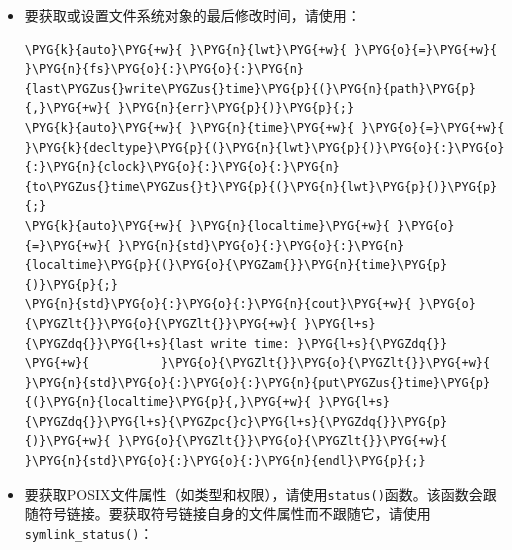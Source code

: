 \begin{itemize}

\item 要获取或设置文件系统对象的最后修改时间，请使用：



\begin{codeblockbg}
\begin{Verbatim}[commandchars=\\\{\},breaklines=true,breakanywhere=true,fontsize=\codefont,xleftmargin=17bp]
\PYG{k}{auto}\PYG{+w}{ }\PYG{n}{lwt}\PYG{+w}{ }\PYG{o}{=}\PYG{+w}{ }\PYG{n}{fs}\PYG{o}{:}\PYG{o}{:}\PYG{n}{last\PYGZus{}write\PYGZus{}time}\PYG{p}{(}\PYG{n}{path}\PYG{p}{,}\PYG{+w}{ }\PYG{n}{err}\PYG{p}{)}\PYG{p}{;}
\PYG{k}{auto}\PYG{+w}{ }\PYG{n}{time}\PYG{+w}{ }\PYG{o}{=}\PYG{+w}{ }\PYG{k}{decltype}\PYG{p}{(}\PYG{n}{lwt}\PYG{p}{)}\PYG{o}{:}\PYG{o}{:}\PYG{n}{clock}\PYG{o}{:}\PYG{o}{:}\PYG{n}{to\PYGZus{}time\PYGZus{}t}\PYG{p}{(}\PYG{n}{lwt}\PYG{p}{)}\PYG{p}{;}
\PYG{k}{auto}\PYG{+w}{ }\PYG{n}{localtime}\PYG{+w}{ }\PYG{o}{=}\PYG{+w}{ }\PYG{n}{std}\PYG{o}{:}\PYG{o}{:}\PYG{n}{localtime}\PYG{p}{(}\PYG{o}{\PYGZam{}}\PYG{n}{time}\PYG{p}{)}\PYG{p}{;}
\PYG{n}{std}\PYG{o}{:}\PYG{o}{:}\PYG{n}{cout}\PYG{+w}{ }\PYG{o}{\PYGZlt{}}\PYG{o}{\PYGZlt{}}\PYG{+w}{ }\PYG{l+s}{\PYGZdq{}}\PYG{l+s}{last write time: }\PYG{l+s}{\PYGZdq{}}
\PYG{+w}{          }\PYG{o}{\PYGZlt{}}\PYG{o}{\PYGZlt{}}\PYG{+w}{ }\PYG{n}{std}\PYG{o}{:}\PYG{o}{:}\PYG{n}{put\PYGZus{}time}\PYG{p}{(}\PYG{n}{localtime}\PYG{p}{,}\PYG{+w}{ }\PYG{l+s}{\PYGZdq{}}\PYG{l+s}{\PYGZpc{}c}\PYG{l+s}{\PYGZdq{}}\PYG{p}{)}\PYG{+w}{ }\PYG{o}{\PYGZlt{}}\PYG{o}{\PYGZlt{}}\PYG{+w}{ }\PYG{n}{std}\PYG{o}{:}\PYG{o}{:}\PYG{n}{endl}\PYG{p}{;}
\end{Verbatim}
\end{codeblockbg}



\item 要获取POSIX文件属性（如类型和权限），请使用\texttt{status()}函数。该函数会跟随符号链接。要获取符号链接自身的文件属性而不跟随它，请使用\texttt{symlink\_\allowbreak{}status()}：




\end{itemize}
